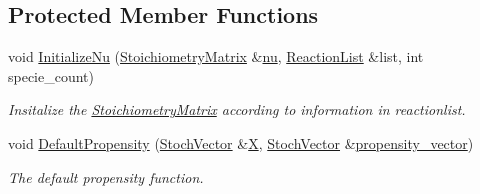 \subsection*{Protected Member Functions}
\begin{CompactItemize}
\item 
void \hyperlink{class_base_system_adc3f9bae0f4abe9cf3d5d09d56b6c65}{InitializeNu} (\hyperlink{class_stoichiometry_matrix}{StoichiometryMatrix} \&\hyperlink{class_base_system_d664dd55778f4e00a06cb3583b4c27e8}{nu}, \hyperlink{class_reaction_list}{ReactionList} \&list, int specie\_\-count)
\begin{CompactList}\small\item\em Insitalize the \hyperlink{class_stoichiometry_matrix}{StoichiometryMatrix} according to information in reactionlist. \item\end{CompactList}\item 
void \hyperlink{class_base_system_5ab5b42237240093f9b3c717ae930c55}{DefaultPropensity} (\hyperlink{class_stoch_vector}{StochVector} \&\hyperlink{class_base_system_1727d447a5fb8c717c72af8eb9ebe2c3}{X}, \hyperlink{class_stoch_vector}{StochVector} \&\hyperlink{class_base_system_95055447038b0fcb98e032142c56ccb9}{propensity\_\-vector})
\begin{CompactList}\small\item\em The default propensity function. \item\end{CompactList}\end{CompactItemize}
